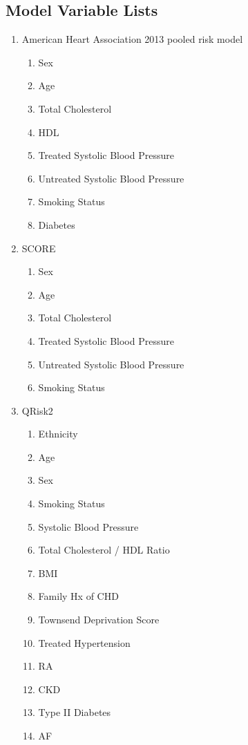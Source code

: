 \documentclass[a4paper,12pt]{article}
\begin{document}
   	\newpage
   	\begin{appendices}
   		
   		\section{Model Variable Lists}
   		\begin{enumerate}
   			\item American Heart Association 2013 pooled risk model
   			\begin{enumerate}
   				\item Sex
   				\item Age
   				\item Total Cholesterol
   				\item HDL
   				\item Treated Systolic Blood Pressure
   				\item Untreated Systolic Blood Pressure
   				\item Smoking Status
   				\item Diabetes
   			\end{enumerate}
   			\item SCORE
   			\begin{enumerate}
   				\item Sex
   				\item Age
   				\item Total Cholesterol
   				\item Treated Systolic Blood Pressure
   				\item Untreated Systolic Blood Pressure
   				\item Smoking Status
   			\end{enumerate}
   			\item QRisk2
   			\begin{enumerate}
   				\item Ethnicity
   				\item Age
   				\item Sex
   				\item Smoking Status
   				\item Systolic Blood Pressure
   				\item Total Cholesterol / HDL Ratio
   				\item BMI
   				\item Family Hx of CHD
   				\item Townsend Deprivation Score
   				\item Treated Hypertension
   				\item RA
   				\item CKD
   				\item Type II Diabetes
   				\item AF 
   			\end{enumerate}
   		\end{enumerate}
   		\newpage
   		

\end{appendices}
\end{document}

